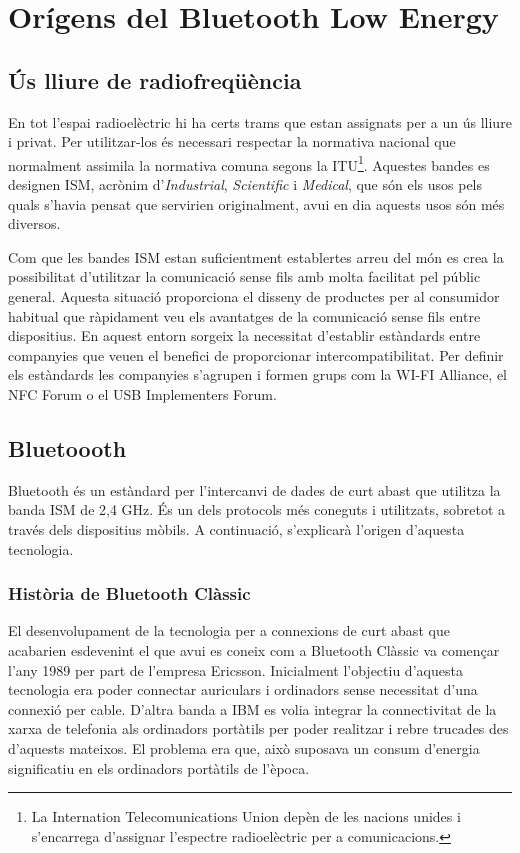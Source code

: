 \chapter{Orígens del Bluetooth Low Energy}\label{C:compaginacio}

\section{Ús lliure de radiofreqüència}
En tot l'espai radioelèctric hi ha certs trams que estan assignats per a un ús lliure i privat.
Per utilitzar-los és necessari respectar la normativa nacional que normalment assimila la normativa comuna segons la ITU\footnote{La Internation Telecomunications Union depèn de les nacions unides i s'encarrega d'assignar l'espectre radioelèctric per a comunicacions.}.
Aquestes bandes es designen ISM, acrònim d'\textit{Industrial}, \textit{Scientific} i \textit{Medical}, que són els usos pels quals s'havia pensat que servirien originalment, avui en dia aquests usos són més diversos.

Com que les bandes ISM estan suficientment establertes arreu del món es crea la possibilitat d'utilitzar la comunicació sense fils amb molta facilitat pel públic general.
Aquesta situació proporciona el disseny de productes per al consumidor habitual que ràpidament veu els avantatges de la comunicació sense fils entre dispositius.
En aquest entorn sorgeix la necessitat d'establir estàndards entre companyies que veuen el benefici de proporcionar intercompatibilitat.
Per definir els estàndards les companyies s'agrupen i formen grups com la WI-FI Alliance, el NFC Forum o el USB Implementers Forum.

\section{Bluetoooth}
Bluetooth és un estàndard per l'intercanvi de dades de curt abast que utilitza la banda ISM de 2,4 GHz.
És un dels protocols més coneguts i utilitzats, sobretot a través dels dispositius mòbils.
A continuació, s'explicarà l'origen d'aquesta tecnologia.

\subsection{Història de Bluetooth Clàssic}
El desenvolupament de la tecnologia per a connexions de curt abast que acabarien esdevenint el que avui es coneix com a Bluetooth Clàssic va començar l'any 1989 per part de l'empresa Ericsson.
Inicialment l'objectiu d'aquesta tecnologia era poder connectar auriculars i ordinadors sense necessitat d'una connexió per cable.
D'altra banda a IBM es volia integrar la connectivitat de la xarxa de telefonia als ordinadors portàtils per poder realitzar i rebre trucades des d'aquests mateixos.
El problema era que, això suposava un consum d'energia significatiu en els ordinadors portàtils de l'època.

